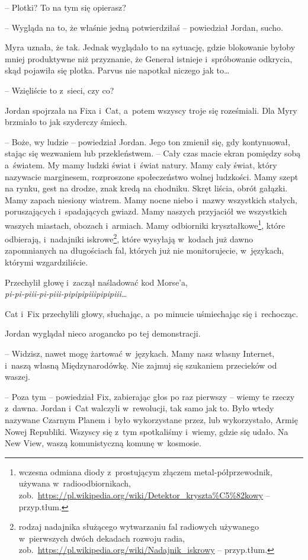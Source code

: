 \documentclass[oneside,polish,11pt,sfheadings]{mwbk}
\begin{document}
-- Plotki? To na tym się opierasz?

-- Wygląda na to, że właśnie jedną potwierdziłaś -- powiedział Jordan,
sucho.

Myra uznała, że tak. Jednak wyglądało to na sytuację, gdzie blokowanie
byłoby mniej produktywne niż przyznanie, że Generał istnieje i~spróbowanie odkrycia, skąd pojawiła się plotka. Parvus nie napotkał
niczego jak to\ldots

-- Wzięliście to z~sieci, czy co?

Jordan spojrzała na Fixa i~Cat, a~potem wszyscy troje się roześmiali.
Dla Myry brzmiało to jak szyderczy śmiech.

-- Boże, wy ludzie -- powiedział Jordan. Jego ton zmienił się, gdy
kontynuował, stając się wezwaniem lub przekleństwem. -- Cały czas macie
ekran pomiędzy sobą a~światem. My mamy ludzki świat i~świat natury. Mamy
cały świat, który nazywacie marginesem, rozproszone społeczeństwo wolnej
ludzkości. Mamy szept na rynku, gest na drodze, znak kredą na chodniku.
Skręt liścia, obrót gałązki. Mamy zapach niesiony wiatrem. Mamy nocne
niebo i~nazwy wszystkich stałych, poruszających i~spadających gwiazd.
Mamy naszych przyjaciół we wszystkich waszych miastach, obozach i~armiach. Mamy odbiorniki kryształkowe\footnote{wczesna odmiana diody z~prostującym złączem metal-półprzewodnik, używana w~radioodbiornikach,
zob.~\url{https://pl.wikipedia.org/wiki/Detektor\_kryszta\%C5\%82kowy}
-- przyp.tłum.}, które odbierają, i~nadajniki iskrowe\footnote{rodzaj
nadajnika służącego wytwarzaniu fal radiowych używanego w~pierwszych
dwóch dekadach rozwoju radia,
zob.~\url{https://pl.wikipedia.org/wiki/Nadajnik\_iskrowy} -- przyp.tłum.}, które wysyłają w~kodach już dawno zapomnianych na
długościach fal, których już nie monitorujecie, w~językach, którymi
wzgardziliście.

Przechylił głowę i~zaczął naśladować kod Morse'a,\\
\textit{pi-pi-piii-pi-piii-pipipipiiipipipiii}\ldots 

Cat i~Fix przechylili
głowy, słuchając, a~po minucie uśmiechając się i~rechocząc.

Jordan wyglądał nieco arogancko po tej demonstracji. 

-- Widzisz, nawet
mogę żartować w~językach. Mamy nasz własny Internet, i~naszą własną
Międzynarodówkę. Nie zajmuj się szukaniem przecieków od waszej.

-- Poza tym -- powiedział Fix, zabierając głos po raz pierwszy -- wiemy te
rzeczy z~dawna. Jordan i~Cat walczyli w~rewolucji, tak samo jak to. Było
wtedy nazywane Czarnym Planem i~było wykorzystane przez, lub
wykorzystało, Armię Nowej Republiki. Wszyscy się z~tym spotkaliśmy i~wiemy, gdzie się udało. Na New View, waszą komunistyczną komunę w~kosmosie.
\end{document}
